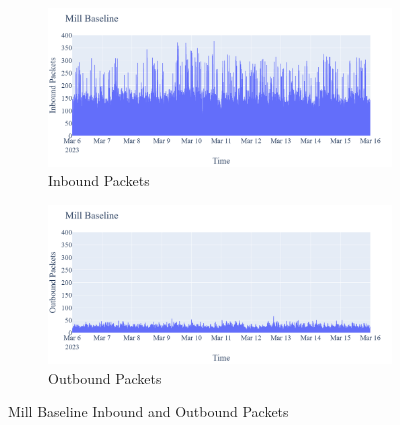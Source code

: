  \begin{figure}[H]
    \centering
    \begin{subfigure}[b]{0.7\textwidth}
        \includegraphics[width=\textwidth]{figures/Mill_Baseline_InboundPackets.png}
        \caption{Inbound Packets}
        \label{fig:MillBaselineInboundPackets}
    \end{subfigure}
    \begin{subfigure}[b]{0.7\textwidth}
        \includegraphics[width=\textwidth]{figures/Mill_Baseline_OutboundPackets.png}
        \caption{Outbound Packets}
        \label{fig:MillBaselineOutboundPackets}
    \end{subfigure}
    \caption{Mill Baseline Inbound and Outbound Packets}
    \label{Fig:MillBaselineOutandInboundPackets}
 \end{figure}

